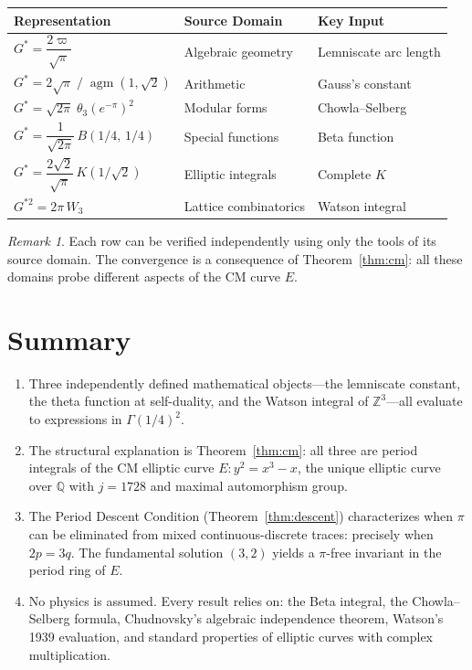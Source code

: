 \documentclass[12pt]{article}
\theoremstyle{definition}
\theoremstyle{remark}
\newtheorem{remark}[theorem]{Remark}
\begin{document}
\begin{center}
\renewcommand{\arraystretch}{1.5}
\begin{tabular}{lll}
\hline
\textbf{Representation} & \textbf{Source Domain} & \textbf{Key Input} \\
\hline
$G^* = \dfrac{2\varpi}{\sqrt{\pi}}$ & Algebraic geometry & Lemniscate arc length \\[6pt]
$G^* = 2\sqrt{\pi}\;/\;\operatorname{agm}(1,\sqrt{2})$ & Arithmetic & Gauss's constant \\[6pt]
$G^* = \sqrt{2\pi}\;\theta_3(e^{-\pi})^2$ & Modular forms & Chowla--Selberg \\[6pt]
$G^* = \dfrac{1}{\sqrt{2\pi}}\,B(1/4,\,1/4)$ & Special functions & Beta function \\[6pt]
$G^* = \dfrac{2\sqrt{2}}{\sqrt{\pi}}\,K(1/\sqrt{2})$ & Elliptic integrals & Complete $K$ \\[6pt]
$G^{*2} = 2\pi\,W_3$ & Lattice combinatorics & Watson integral \\[6pt]
\hline
\end{tabular}
\end{center}

\begin{remark}
Each row can be verified independently using only the tools of its source domain. The convergence is a consequence of Theorem~\ref{thm:cm}: all these domains probe different aspects of the CM curve $E$.
\end{remark}

\section{Summary}

\begin{enumerate}
    \item Three independently defined mathematical objects---the lemniscate constant, the theta function at self-duality, and the Watson integral of $\mathbb{Z}^3$---all evaluate to expressions in $\Gamma(1/4)^2$.

    \item The structural explanation is Theorem~\ref{thm:cm}: all three are period integrals of the CM elliptic curve $E\!: y^2 = x^3 - x$, the unique elliptic curve over $\mathbb{Q}$ with $j = 1728$ and maximal automorphism group.

    \item The Period Descent Condition (Theorem~\ref{thm:descent}) characterizes when $\pi$ can be eliminated from mixed continuous-discrete traces: precisely when $2p = 3q$. The fundamental solution $(3,2)$ yields a $\pi$-free invariant in the period ring of $E$.

    \item No physics is assumed. Every result relies on: the Beta integral, the Chowla--Selberg formula, Chudnovsky's algebraic independence theorem, Watson's 1939 evaluation, and standard properties of elliptic curves with complex multiplication.
\end{enumerate}
\end{document}
